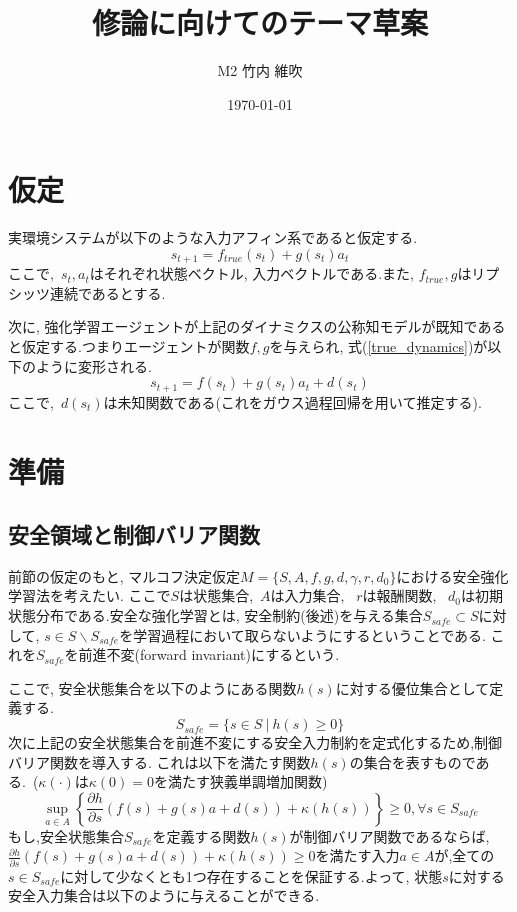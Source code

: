 \documentclass{jsarticle}
\title{\large{\bf{修論に向けてのテーマ草案}}}
\author{M2 竹内 維吹}
\date{\today}
\newcommand{\pdif}[2]{\frac{\partial#1}{\partial#2}}
\begin{document}
\maketitle


\section{仮定}
実環境システムが以下のような入力アフィン系であると仮定する.
\begin{equation}
	s_{t+1}=f_{true}(s_t)+g(s_t)a_t \label{true_dynamics}
\end{equation}
ここで,~$s_t, a_t$はそれぞれ状態ベクトル, 入力ベクトルである.また, $f_{true}, g$はリプシッツ連続であるとする.\par
次に, 強化学習エージェントが上記のダイナミクスの公称知モデルが既知であると仮定する.つまりエージェントが関数$f,g$を与えられ, 式(\ref{true_dynamics})が以下のように変形される.
\begin{equation}
	s_{t+1}=f(s_t)+g(s_t)a_t+d(s_t) \label{pred_dynamics}
\end{equation}
ここで,~$d(s_t)$は未知関数である(これをガウス過程回帰を用いて推定する). \par

\section{準備}
\subsection{安全領域と制御バリア関数}
前節の仮定のもと, マルコフ決定仮定$M=\{S,A,f,g,d,\gamma,r,d_0\}$における安全強化学習法を考えたい. ここで$S$は状態集合,~$A$は入力集合, ~$r$は報酬関数, ~$d_0$は初期状態分布である.安全な強化学習とは, 安全制約(後述)を与える集合$S_{safe}\subset{S}$に対して, $s\in S\backslash S_{safe}$を学習過程において取らないようにするということである. これを$S_{safe}$を前進不変(forward invariant)にするという.\par
ここで, 安全状態集合を以下のようにある関数$h(s)$に対する優位集合として定義する.
\begin{equation}
	S_{safe}=\{s\in S~|~h(s)\geq 0\}
\end{equation}
次に上記の安全状態集合を前進不変にする安全入力制約を定式化するため,制御バリア関数を導入する. これは以下を満たす関数$h(s)$の集合を表すものである.~($\kappa(\cdot)$は$\kappa(0)=0$を満たす狭義単調増加関数)
\begin{equation}
	\sup_{a\in A}\left\{\pdif{h}{s}(f(s)+g(s)a+d(s))+\kappa(h(s))\right\}\geq 0, \forall s\in S_{safe}
\end{equation}
もし,安全状態集合$S_{safe}$を定義する関数$h(s)$が制御バリア関数であるならば, $\pdif{h}{s}(f(s)+g(s)a+d(s))+\kappa(h(s))\geq 0$を満たす入力$a\in A$が,全ての$s\in S_{safe}$に対して少なくとも1つ存在することを保証する.よって, 状態$s$に対する安全入力集合は以下のように与えることができる. 
\end{document}
